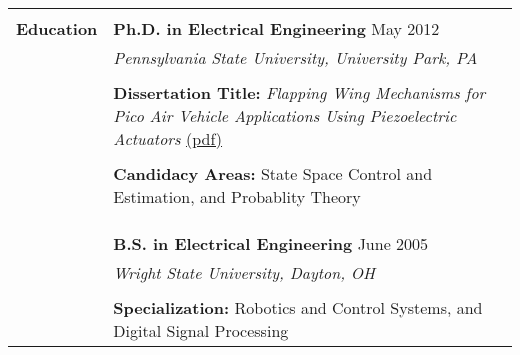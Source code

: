\begin{tabular}{L{\hlcolw}  L{\rcolw}}
    \\ 
    \hline  
    \hline   
    \\
\textbf{\Large Education} & \textbf{\large Ph.D. in Electrical Engineering} \hfill {\large May 2012} 
\vspace{0.05in} \\ 
& {\it\large Pennsylvania State University, University Park, PA} \\ \\
&  \textbf{Dissertation Title:} \textit{Flapping Wing Mechanisms for Pico Air Vehicle Applications Using Piezoelectric Actuators}
\href{https://www.me.psu.edu/mrl/theses/mateti.pdf}{(pdf)} 
\\
\\
&  \textbf{Candidacy Areas:} State Space Control and Estimation, and Probablity Theory
\\
\\
&
\vspace{-0.2in} 

\\
\\
& \textbf{\large B.S. in Electrical Engineering} \hfill {\large June 2005}
\vspace{0.05in} \\
& {\it\large Wright State University, Dayton, OH} \\ \\ 
&  \textbf{Specialization:} Robotics and Control Systems, and Digital Signal Processing
\end{tabular}